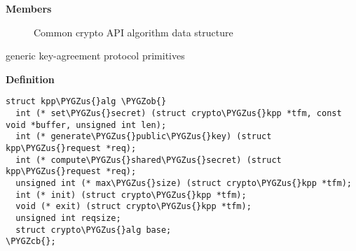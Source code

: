 \documentclass[a4paper,8pt,english]{sphinxmanual}
\def\PYGZus{\char`\_}
\def\PYGZob{\char`\{}
\def\PYGZcb{\char`\}}
\begin{document}
\textbf{Members}
\begin{description}
\item[{}] \leavevmode
Common crypto API algorithm data structure

\end{description}

\begin{fulllineitems}
\label{crypto/api-kpp:c.kpp_alg}
generic key-agreement protocol primitives

\end{fulllineitems}


\textbf{Definition}

\begin{Verbatim}[commandchars=\\\{\}]
struct kpp\PYGZus{}alg \PYGZob{}
  int (* set\PYGZus{}secret) (struct crypto\PYGZus{}kpp *tfm, const void *buffer, unsigned int len);
  int (* generate\PYGZus{}public\PYGZus{}key) (struct kpp\PYGZus{}request *req);
  int (* compute\PYGZus{}shared\PYGZus{}secret) (struct kpp\PYGZus{}request *req);
  unsigned int (* max\PYGZus{}size) (struct crypto\PYGZus{}kpp *tfm);
  int (* init) (struct crypto\PYGZus{}kpp *tfm);
  void (* exit) (struct crypto\PYGZus{}kpp *tfm);
  unsigned int reqsize;
  struct crypto\PYGZus{}alg base;
\PYGZcb{};
\end{Verbatim}
\end{document}
